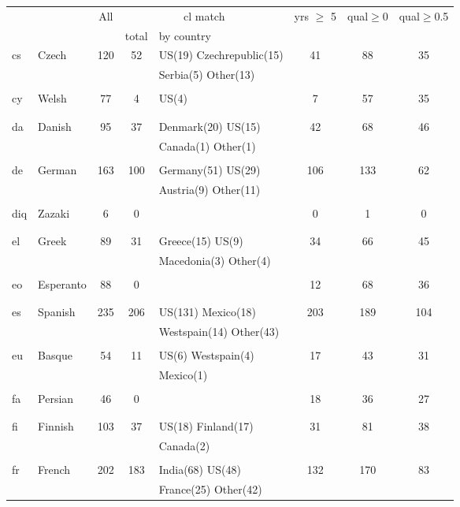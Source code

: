 \begin{figure}[h]
\centering
\begin{tabular}{llcclccc}
&&All&\multicolumn{2}{c}{cl match}&yrs $\geq$ 5&qual$\geq$0&qual$\geq$0.5\\
&&&total&by country&&\\
\hline\hline
cs&Czech&120&52&US(19) Czechrepublic(15) &41&88&35\\
&&&&Serbia(5) Other(13) &&&\\
&&&&&&&\\
cy&Welsh&77&4&US(4) &7&57&35\\
&&&&&&&\\
&&&&&&&\\
da&Danish&95&37&Denmark(20) US(15) &42&68&46\\
&&&&Canada(1) Other(1) &&&\\
&&&&&&&\\
de&German&163&100&Germany(51) US(29) &106&133&62\\
&&&&Austria(9) Other(11) &&&\\
&&&&&&&\\
diq&Zazaki&6&0&&0&1&0\\
&&&&&&&\\
&&&&&&&\\
el&Greek&89&31&Greece(15) US(9) &34&66&45\\
&&&&Macedonia(3) Other(4) &&&\\
&&&&&&&\\
eo&Esperanto&88&0&&12&68&36\\
&&&&&&&\\
&&&&&&&\\
es&Spanish&235&206&US(131) Mexico(18) &203&189&104\\
&&&&Westspain(14) Other(43) &&&\\
&&&&&&&\\
eu&Basque&54&11&US(6) Westspain(4) &17&43&31\\
&&&&Mexico(1) &&&\\
&&&&&&&\\
fa&Persian&46&0&&18&36&27\\
&&&&&&&\\
&&&&&&&\\
fi&Finnish&103&37&US(18) Finland(17) &31&81&38\\
&&&&Canada(2) &&&\\
&&&&&&&\\
fr&French&202&183&India(68) US(48) &132&170&83\\
&&&&France(25) Other(42) &&&\\

\end{tabular}
\end{figure}
